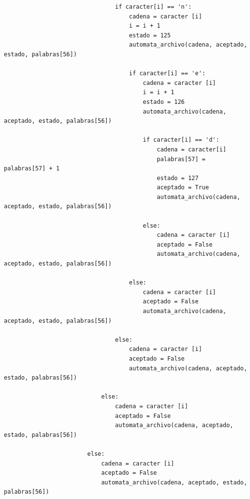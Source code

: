 \documentclass{article}
\begin{document}
\begin{flushleft}
\begin{lstlisting}
                                if caracter[i] == 'n':
                                    cadena = caracter [i]
                                    i = i + 1
                                    estado = 125
                                    automata_archivo(cadena, aceptado, estado, palabras[56])
                                    
                                    if caracter[i] == 'e':
                                        cadena = caracter [i]
                                        i = i + 1
                                        estado = 126
                                        automata_archivo(cadena, aceptado, estado, palabras[56])
                                    
                                        if caracter[i] == 'd':
                                            cadena = caracter[i]
                                            palabras[57] = palabras[57] + 1
                                            estado = 127
                                            aceptado = True
                                            automata_archivo(cadena, aceptado, estado, palabras[56])
                                            
                                        else:
                                            cadena = caracter [i]
                                            aceptado = False
                                            automata_archivo(cadena, aceptado, estado, palabras[56])
                                    
                                    else:
                                        cadena = caracter [i]
                                        aceptado = False
                                        automata_archivo(cadena, aceptado, estado, palabras[56])
                                        
                                else:
                                    cadena = caracter [i]
                                    aceptado = False
                                    automata_archivo(cadena, aceptado, estado, palabras[56])
                                
                            else:
                                cadena = caracter [i]
                                aceptado = False
                                automata_archivo(cadena, aceptado, estado, palabras[56])
                                
                        else:
                            cadena = caracter [i]
                            aceptado = False
                            automata_archivo(cadena, aceptado, estado, palabras[56])
                            

\end{lstlisting}
\end{flushleft}
\end{document}
